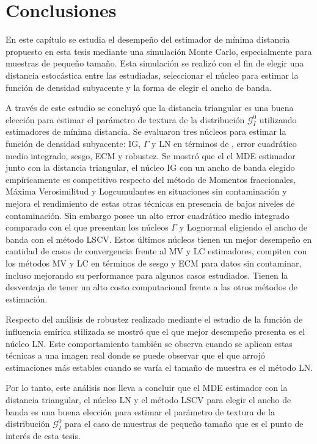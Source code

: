 \section{Conclusiones}

En este capítulo se estudia el desempeño del estimador de mínima distancia propuesto en esta tesis mediante una simulación Monte Carlo, especialmente para muestras de pequeño tamaño. Esta simulación se realizó con el fin de elegir una distancia estocástica entre las estudiadas, seleccionar el núcleo para estimar la función de densidad subyacente y la forma de elegir el ancho de banda.

A través de este estudio se concluyó que la distancia triangular es una buena elección para estimar el parámetro de textura de la distribución $\mathcal{G}_I^0$ utilizando estimadores de mínima distancia. Se evaluaron tres núcleos para estimar la función de densidad subyacente: IG, $\Gamma$ y LN en términos de , error cuadrático medio integrado, sesgo, ECM y robustez. Se mostró que el el MDE estimador junto con la distancia triangular, el núcleo IG con un ancho de banda elegido empíricamente es competitivo respecto del método de Momentos fraccionales, Máxima Verosimilitud y Logcumulantes en situaciones sin contaminación y mejora el rendimiento de estas otras técnicas en presencia de bajos niveles de contaminación. Sin embargo posee un alto error cuadrático medio integrado comparado con el que presentan los núcleos $\Gamma$ y Lognormal eligiendo el ancho de banda con el método LSCV. Estos últimos núcleos tienen un mejor desempeño en cantidad de casos de convergencia frente al MV y LC estimadores, compiten con los métodos MV y LC en términos de sesgo y ECM para datos sin contaminar, incluso mejorando su performance para algunos casos estudiados. Tienen la desventaja de tener un alto costo computacional frente a las otros métodos de estimación.

Respecto del análisis de robustez realizado mediante el estudio de la función de influencia emírica stilizada se mostró que el que mejor desempeño presenta es el núcleo LN. Este comportamiento también se observa cuando se aplican estas técnicas a una imagen real donde se puede observar que el que arrojó estimaciones más estables cuando se varía el tamaño de muestra es el método LN.

 Por lo tanto, este análisis nos lleva a concluir que el MDE estimador con la distancia triangular, el núcleo LN y el método LSCV para elegir el ancho de banda es una buena elección para estimar el parámetro de textura de la distribución $\mathcal{G}_I^0$ para el caso de muestras de pequeño tamaño que es el punto de interés de esta tesis.
